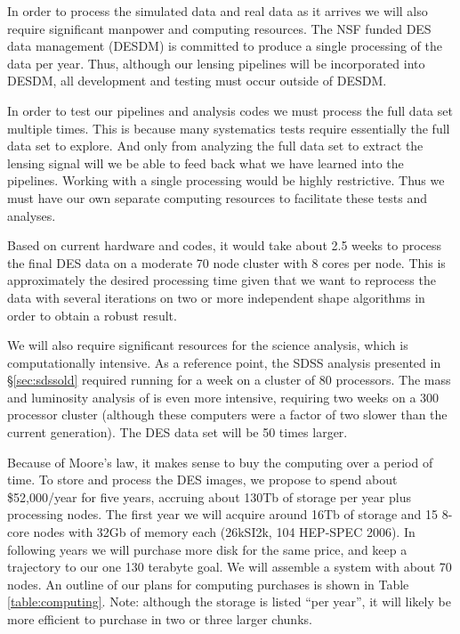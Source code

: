 \documentclass[12pt]{article}
\begin{document}
In order to process the simulated data and real data as it arrives we will also
require significant manpower and computing resources.  The NSF funded DES data
management (DESDM) is committed to produce a single processing of the data per
year.  Thus, although our lensing pipelines will be incorporated into DESDM,
all development and testing must occur outside of DESDM.  

In order to test our pipelines and analysis codes we must process the full data
set multiple times.  This is because many systematics tests require essentially
the full data set to explore.  And only from analyzing the full data set to
extract the lensing signal will we be able to feed back what we have learned
into the pipelines.  Working with a single processing would be highly
restrictive.  Thus we must have our own separate computing resources to
facilitate these tests and analyses.  

Based on current hardware and codes, it would take about 2.5 weeks to process
the final DES data on a moderate 70 node cluster with 8 cores per node.  This
is approximately the desired processing time given that we want to reprocess
the data with several iterations on two or more independent shape algorithms in
order to obtain a robust result.


We will also require significant resources for the science analysis, which is
computationally intensive.  As a reference point, the SDSS analysis presented
in \S \ref{sec:sdssold} required running for a week on a cluster of 80
processors.  The mass and luminosity analysis of \cite{SheldonM2L07} is even
more intensive, requiring two weeks on a 300 processor cluster (although these
computers were a factor of two slower than the current generation).  The DES
data set will be 50 times larger.

Because of Moore's law, it makes sense to buy the computing over a period of
time.  To store and process the DES images, we propose to spend about
\$52,000/year for five years, accruing about 130Tb of storage per year plus
processing nodes.  The first year we will acquire around 16Tb of storage and 15
8-core nodes with 32Gb of memory each (26kSI2k, 104 HEP-SPEC 2006).  In
following years we will purchase more disk for the same price, and keep a
trajectory to our one 130 terabyte goal.   We will assemble a system with about
70 nodes.  An outline of our plans for computing purchases is shown in Table
\ref{table:computing}.  Note: although the storage is listed ``per year'', 
it will likely be more efficient to purchase in two or three larger chunks.
\end{document}
